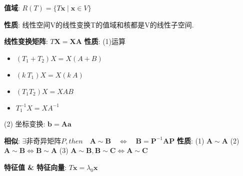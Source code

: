 \documentclass{article}
\begin{document}
        \textbf{值域}: $R(T)=\{T \boldsymbol{x} \mid \boldsymbol{x} \in V\}$

            \textbf{性质}: 线性空间V的线性变换T的值域和核都是V的线性子空间.

        \textbf{线性变换矩阵}: $T \boldsymbol X = \boldsymbol X \boldsymbol A$ 
            \textbf{性质}: 
            (1)运算
                \begin{itemize}
                    \item $(T_1 + T_2) X = X (A + B)$
                    \item $(k\ T_1) X = X (k\ A)$
                    \item $(T_1 T_2) X = X AB$
                    \item $T_1^{-1} X = X A^{-1}$
                \end{itemize}
            (2) 坐标变换: $\boldsymbol b = \boldsymbol A \boldsymbol a$

        \textbf{相似}: $\exists \text{非奇异矩阵}P, then \quad \boldsymbol A \sim \boldsymbol B \quad \Leftrightarrow \quad \boldsymbol B = \boldsymbol P^{-1} \boldsymbol A \boldsymbol P$
            \textbf{性质}: 
            (1) $\boldsymbol A \sim \boldsymbol A$ 
            (2) $\boldsymbol A \sim \boldsymbol B \Leftrightarrow \boldsymbol B \sim \boldsymbol A$ 
            (3) $\boldsymbol A \sim \boldsymbol B, \boldsymbol B \sim \boldsymbol C \Leftrightarrow \boldsymbol A \sim \boldsymbol C$

        \textbf{特征值 \& 特征向量}: $T \boldsymbol x = \lambda_0 \boldsymbol x$
        
\end{document}
